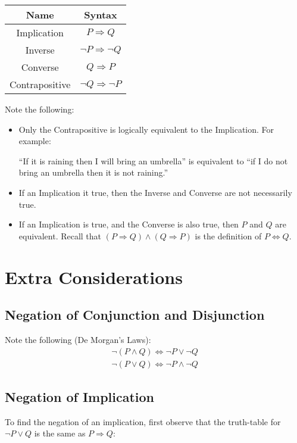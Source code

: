 \documentclass[11pt, a4paper, oneside]{exam}
\theoremstyle{definition}\newtheorem{define}{Definition}[section]
\theoremstyle{remark}\newtheorem{remark}{Remark}
\theoremstyle{definition}\newtheorem{example}{Example}[subsection]
\theoremstyle{definition}\newtheorem{notation}{Notation}[section]
\theoremstyle{definition}\newtheorem{theorem}{Theorem}[section]
\theoremstyle{definition}\newtheorem{corollary}{Corollary}[section]
\begin{document}
\begin{center}
	\begin{tabular}{|c|c|}\hline
		Name & Syntax\\\hline
		Implication & $P \Rightarrow Q$\\
		Inverse & $\neg P \Rightarrow \neg Q$\\
		Converse & $Q \Rightarrow P$\\
		Contrapositive & $\neg Q \Rightarrow \neg P$\\ \hline
	\end{tabular}
\end{center}

Note the following:
\begin{itemize}
	\item Only the Contrapositive is logically equivalent to the Implication. For example:

``If it is raining then I will bring an umbrella'' is equivalent to ``if I do not bring an umbrella then it is not raining.''

	\item If an Implication it true, then the Inverse and Converse are not necessarily true. 
	\item If an Implication is true, and the Converse is also true, then $P$ and $Q$ are equivalent. Recall that $(P \Rightarrow Q) \land (Q \Rightarrow P)$ is the definition of $P \Leftrightarrow Q$.
\end{itemize}

\section{Extra Considerations}
\subsection{Negation of Conjunction and Disjunction}
Note the following (De Morgan's Laws):
\begin{align*}
	\neg (P \land Q) \Leftrightarrow \neg P \lor \neg Q\\
	\neg (P \lor Q) \Leftrightarrow \neg P \land \neg Q
\end{align*}
\subsection{Negation of Implication}
To find the negation of an implication, first observe that the truth-table for $\neg P \lor Q$ is the same as $P \Rightarrow Q$:
\end{document}
